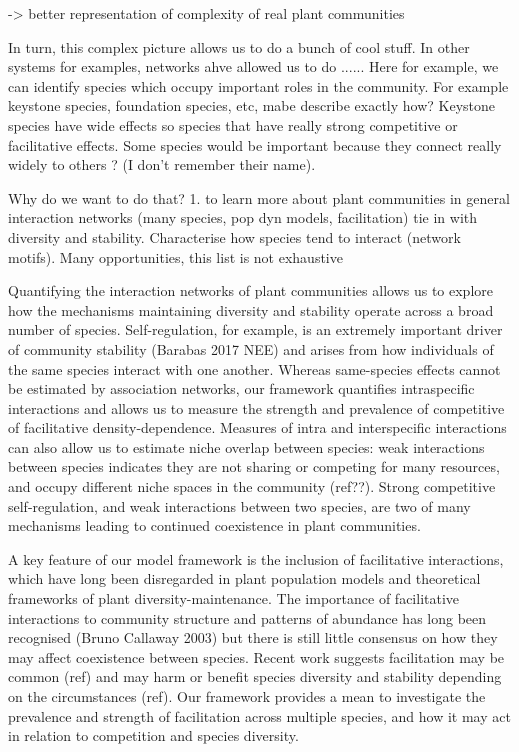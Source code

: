 \documentclass[a4,12pt]{article}
\begin{document}
    -> better representation of complexity of real plant communities
        
        In turn, this complex picture allows us to do a bunch of cool stuff. In other systems for examples, networks ahve allowed us to do ...... Here for example, we can identify species which occupy important roles in the community. For example keystone species, foundation species, etc, mabe describe exactly how? Keystone species have wide effects so species that have really strong competitive or facilitative effects. Some species would be important because they connect really widely to others ? (I don't remember their name). 

    Why do we want to do that? 
    1. to learn more about plant communities in general 
    interaction networks (many species, pop dyn models, facilitation) tie in with diversity and stability. Characterise how species tend to interact (network motifs). Many opportunities, this list is not exhaustive

    Quantifying the interaction networks of plant communities allows us to explore how the mechanisms maintaining diversity and stability operate across a broad number of species. Self-regulation, for example, is an extremely important driver of community stability (Barabas 2017 NEE) and arises from how individuals of the same species interact with one another. Whereas same-species effects cannot be estimated by association networks, our framework quantifies intraspecific interactions and allows us to measure the strength and prevalence of competitive of facilitative density-dependence. Measures of intra and interspecific interactions can also allow us to estimate niche overlap between species: weak interactions between species indicates they are not sharing or competing for many resources, and occupy different niche spaces in the community (ref??). Strong competitive self-regulation, and weak interactions between two species, are two of many mechanisms leading to continued coexistence in plant communities.

    A key feature of our model framework is the inclusion of facilitative interactions, which have long been disregarded in plant population models and theoretical frameworks of plant diversity-maintenance. The importance of facilitative interactions to community structure and patterns of abundance has long been recognised (Bruno Callaway 2003) but there is still little consensus on how they may affect coexistence between species. Recent work suggests facilitation may be common (ref) and may harm or benefit species diversity and stability depending on the circumstances (ref). Our framework provides a mean to investigate the prevalence and strength of facilitation across multiple species, and how it may act in relation to competition and species diversity. 
\end{document}
